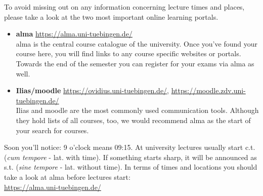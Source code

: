 
To avoid missing out on any information concerning lecture times and places, please take a look at the two most important online learning portals.
\begin{itemize}
	\item \textbf{alma} \url{https://alma.uni-tuebingen.de/} \\
	alma is the central course catalogue of the university. Once you've found your course here, you will find links to any course specific websites or portals.
	Towards the end of the semester you can register for your exams via alma as well. 
	\item \textbf{Ilias/moodle} \url{https://ovidius.uni-tuebingen.de/}, \url{https://moodle.zdv.uni-tuebingen.de/} \\
	Ilias and moodle are the most commonly used communication tools. Although they hold lists of all courses, too, we would recommend alma as the start of your search for courses.
\end{itemize}

Soon you'll notice: 9 o'clock means 09:15. At university lectures usually start c.t. (\textit{cum
tempore} - lat. with time). If something starts \glqq sharp\grqq, it will be announced as s.t. (\textit{sine tempore} - lat. without
time). In terms of times and locations you should take a look at alma before lectures start:\\
\url{https://alma.uni-tuebingen.de/} \\ \\

